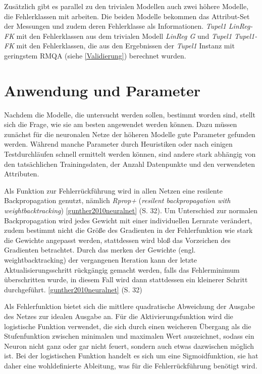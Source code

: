 \documentclass[
	12pt,
	a4paper,
	BCOR10mm,
	DIV14,
	listof=totoc,
	bibliography=totoc,
	headsepline
]{scrreprt}
\begin{document}
Zusätzlich gibt es parallel zu den trivialen Modellen auch zwei höhere Modelle, die Fehlerklassen mit arbeiten. Die beiden Modelle bekommen das Attribut-Set der Messungen und zudem deren Fehlerklasse als Informationen. \textit{Tupel1 LinReg-FK} mit den Fehlerklassen aus dem trivialen Modell \textit{LinReg G} und \textit{Tupel1 Tupel1-FK} mit den Fehlerklassen, die aus den Ergebnissen der \textit{Tupel1} Instanz mit geringstem RMQA (siehe \ref{Validierung}) berechnet wurden.

\section{Anwendung und Parameter}
Nachdem die Modelle, die untersucht werden sollen, bestimmt worden sind, stellt sich die Frage, wie sie am besten angewendet werden können. Dazu müssen zunächst für die neuronalen Netze der höheren Modelle gute Parameter gefunden werden.
Während manche Parameter durch Heuristiken oder nach einigen Testdurchläufen schnell ermittelt werden können, sind andere stark abhängig von den tatsächlichen Trainingsdaten, der Anzahl Datenpunkte und den verwendeten Attributen. 

Als Funktion zur Fehlerrückführung wird in allen Netzen eine resilente Backpropagation genutzt, nämlich \textit{Rprop+} (\textit{resilent backpropagation with weightbacktracking}) \ref{gunther2010neuralnet} (S. 32). Um Unterschied zur normalen Backpropagation wird jedes Gewicht mit einer individuellen Lernrate verändert, zudem bestimmt nicht die Größe des Gradienten in der Fehlerfunktion wie stark die Gewichte angepasst werden, stattdessen wird bloß das Vorzeichen des Gradienten betrachtet. Durch das merken der Gewichte (engl. weightbacktracking) der vergangenen Iteration kann der letzte Aktualisierungsschritt rückgängig gemacht werden, falls das Fehlerminimum überschritten wurde, in diesem Fall wird dann stattdessen ein kleinerer Schritt durchgeführt. \ref{gunther2010neuralnet} (S. 32)

Als Fehlerfunktion bietet sich die mittlere quadratische Abweichung der Ausgabe des Netzes zur idealen Ausgabe an.
Für die Aktivierungsfunktion wird die logistische Funktion verwendet, die sich durch einen weicheren Übergang als die Stufenfunktion zwischen minimalen und maximalen Wert auszeichnet, sodass ein Neuron nicht ganz oder gar nicht feuert, sondern auch etwas dazwischen möglich ist. Bei der logistischen Funktion handelt es sich um eine Sigmoidfunktion, sie hat daher eine wohldefinierte Ableitung, was für die Fehlerrückführung benötigt wird. 
\end{document}
